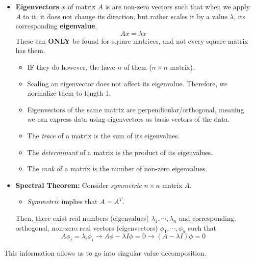 \documentclass{article}
\begin{document}
\begin{itemize}
    \item \textbf{Eigenvectors} $x$ of matrix $A$ is are non-zero vectors such that when we apply $A$ to it, it does not change its direction, but rather scales it by a value $\lambda$, its corresponding \textbf{eigenvalue}.
    $$Ax = \lambda x$$
    These can \textbf{ONLY} be found for square matrices, and not every square matrix has them. 
    \begin{itemize}
        \item IF they do however, the have $n$ of them ($n\times n$ matrix).
        \item Scaling an eigenvector does not affect its eigenvalue. Therefore, we normalize them to length 1.
        \item Eigenvectors of the same matrix are perpendicular/orthogonal, meaning we can express data using eigenvectors as basis vectors of the data.
        \item The \textit{trace} of a matrix is the sum of its eigenvalues. 
        \item The \textit{determinant} of a matrix is the product of its eigenvalues. 
        \item The \textit{rank} of a matrix is the number of non-zero eigenvalues. 
    \end{itemize}
    \item \textbf{Spectral Theorem:} Consider \textit{symmetric} $n \times n$ matrix $A$. 
    \begin{itemize}
        \item \textit{Symmetric} implies that $A = A^T$.
    \end{itemize} Then, there exist real numbers (eigenvalues) $\lambda_1, \cdots, \lambda_n$ and corresponding, orthogonal, non-zero real vectors (eigenvectors) $\phi_1,\cdots,\phi_n$ such that
    $$A\phi_i = \lambda_i\phi_i\rightarrow A\phi - \lambda I\phi = 0 \rightarrow (A - \lambda I)\phi = 0$$
\end{itemize}
This information allows us to go into singular value decomposition.
\end{document}
